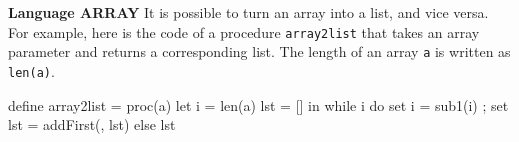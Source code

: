 \begin{minipage}[t]{\sw}
\slidenumber
\LARGE
{\bf Language ARRAY}\exx
It is possible to turn an array into a list, and vice versa.
For example, here is the code of a procedure \verb'array2list'
that takes an array parameter and returns a corresponding list.
The length of an array \verb'a' is written as \verb'len(a)'.
\begin{qv}
define array2list = proc(a)
  let
    i = len(a)
    lst = []
  in
    while i do
      { set i = sub1(i)
      ; set lst = addFirst(\a[i], lst)
      }
    else
      lst
\end{qv}
\end{minipage}
